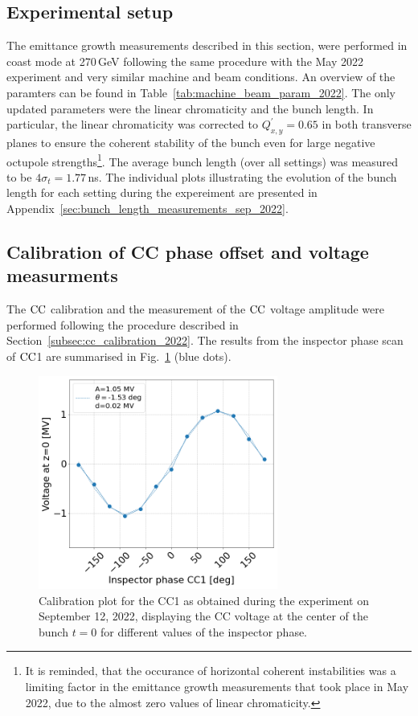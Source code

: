 \subsection{Experimental setup}
The emittance growth measurements described in this section, were performed in coast mode at 270\,GeV following the same procedure with the May 2022 experiment and very similar machine and beam conditions. An overview of the paramters can be found in Table~\ref{tab:machine_beam_param_2022}. The only updated parameters were the linear chromaticity and the bunch length. In particular, the linear chromaticity was corrected to $Q^\prime_{x,y}=0.65$ in both transverse planes to ensure the coherent stability of the bunch even for large negative octupole strengths\footnote{It is reminded, that the occurance of horizontal coherent instabilities was a limiting factor in the emittance growth measurements that took place in May 2022, due to the almost zero values of linear chromaticity.}. The average bunch length (over all settings) was measured to be $4\sigma_t=1.77$\,ns. The individual plots illustrating the evolution of the bunch length for each setting during the expereiment are presented in Appendix~\ref{sec:bunch_length_measurements_sep_2022}.


\subsection{Calibration of CC phase offset and voltage measurments}
The ${\mathrm{CC}}$ calibration and the measurement of the ${\mathrm{CC}}$ voltage amplitude were performed following the procedure described in Section~\ref{subsec:cc_calibration_2022}. The results from the inspector phase scan of ${\mathrm{CC}}$1 are summarised in Fig.~\ref{fig:Vcc_calibration_md_sep2022} (blue dots).

\begin{figure}[!h] %
   \centering         
   \includegraphics[width=0.7\textwidth]{images/Ch8/Vcc_at_z_zero_vs_inspector_phase_CC1_for_thesis_sep22.png}
       \caption{Calibration plot for the CC1 as obtained during the experiment on September 12, 2022, displaying the CC voltage at the center of the bunch $t=0$ for different values of the inspector phase.}
       \label{fig:Vcc_calibration_md_sep2022}
\end{figure}

